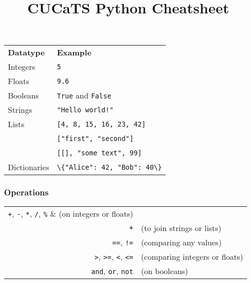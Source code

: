 \documentclass[12pt,twocolumn]{article}
\title{CUCaTS Python Cheatsheet}
\date{}
\begin{document}
	\maketitle
	
	\vspace*{-1cm}
	
	\begin{tabular}{l l}
		\textbf{Datatype} & \textbf{Example} \\

		Integers &
		\colorbox{codebg}{\lstinline|5|} \\
		
		Floats &
		\colorbox{codebg}{\lstinline|9.6|} \\
		
		Booleans &
		\colorbox{codebg}{\lstinline|True|} and \colorbox{codebg}{\lstinline|False|} \\
		
		Strings &
		\colorbox{codebg}{\lstinline|"Hello world!"|} \\
		
		Lists &
		\colorbox{codebg}{\lstinline|[4, 8, 15, 16, 23, 42]|} \vspace{0.5mm} \\
		\, &
		\colorbox{codebg}{\lstinline|["first", "second"]|} \vspace{0.5mm} \\
		\, &
		\colorbox{codebg}{\lstinline|[[], "some text", 99]|} \vspace{0.5mm} \\
		
		Dictionaries &
		\colorbox{codebg}{\lstinline|\{"Alice": 42, "Bob": 40\}|}
	\end{tabular}
	
	\subsubsection*{Operations}
	
	\begin{tabular}{r l}
		\lstinline|+|, \lstinline|-|, \lstinline|*|, \lstinline|/|, \lstinline|%| &
		(on integers or floats) \\
	
		\lstinline|+| & (to join strings or lists) \\
	
		\lstinline|==|, \lstinline|!=| & (comparing any values) \\
	
		\lstinline|>|, \lstinline|>=|, \lstinline|<|, \lstinline|<=| &
		(comparing integers or floats) \\
		
		\lstinline|and|, \lstinline|or|, \lstinline|not| & (on booleans)
	\end{tabular}
	
\end{document}
